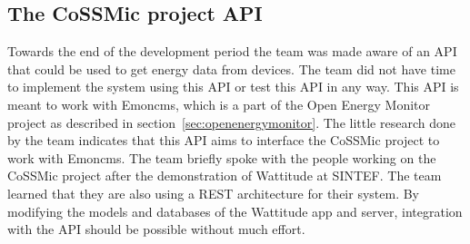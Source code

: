 \subsection{The CoSSMic project API}
\label{sec:cossmicapi}
Towards the end of the development period the team was made aware of an API that could be used to get energy data from devices. The team did not have time to implement the system using this API or test this API in any way. This API is meant to work with Emoncms, which is a part of the Open Energy Monitor project as described in section~\ref{sec:openenergymonitor}. The little research done by the team indicates that this API aims to interface the CoSSMic project to work with Emoncms. The team briefly spoke with the people working on the CoSSMic project after the demonstration of Wattitude at SINTEF. The team learned that they are also using a REST architecture for their system. By modifying the models and databases of the Wattitude app and server, integration with the API should be possible without much effort.
